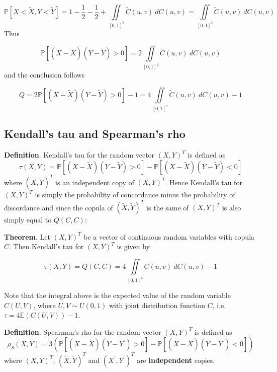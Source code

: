\documentclass{article}
\begin{document}
\begin{equation}
\mathbb{P}[X < \tilde X, Y < \tilde Y] = 1 - \frac{1}{2} - \frac{1}{2} + \iint\limits_{[0, 1]^2} \tilde C(u, v) \> dC(u, v) =
\iint\limits_{[0, 1]^2} \tilde C(u, v) \> dC(u, v)
\end{equation}
Thus

\begin{equation}
\mathbb{P}[(X-\tilde X)(Y-\tilde Y) > 0] = 2 \iint\limits_{[0, 1]^2} \tilde C(u, v) \> dC(u, v)
\end{equation}
and the conclusion follows

\begin{equation}
Q = 2 \mathbb{P}[(X-\tilde X)(Y-\tilde Y) > 0] - 1 = 4 \iint\limits_{[0, 1]^2} \tilde C(u, v) \> dC(u, v) - 1
\end{equation}

\subsection{Kendall's tau and Spearman's rho}

\textbf{Definition}. Kendall's tau for the random vector $(X, Y)^T$ is defined as
\begin{equation}
\tau (X, Y) =\mathbb{P}[(X-\tilde X)(Y-\tilde Y) > 0]-\mathbb{P}[(X-\tilde X)(Y-\tilde Y) < 0] 
\end{equation}
where $(\tilde X, \tilde Y)^T$ is an independent copy of $(X, Y)^T$.
Hence Kendall's tau for $(X, Y)^T$ is simply the probability of concordance minus the probability of discordance and since the copula of  $(\tilde X, \tilde Y)^T$ is the same of $(X, Y)^T$ is also simply equal to $Q(C, C)$:

\noindent\textbf{Theorem}. Let $(X, Y)^T$ be a vector of continuous random variables with copula $C$. Then Kendall's tau for $(X, Y)^T$ is given by 

\begin{equation}
\tau (X,Y) = Q(C, C) = 4 \iint\limits_{[0, 1]^2} C(u, v) \> dC(u, v) - 1
\end{equation}

\noindent Note that the integral above is the expected value of the random variable $C(U, V)$, where $U, V \sim U(0, 1)$ with joint distribution function $C$, i.e. $\tau = 4 \mathbb{E}(C(U,V)) - 1$.

\textbf{Definition}.  Spearman's rho for the random vector  $(X, Y)^T$ is defined as
\begin{equation}
\rho_S (X, Y) =3 (\mathbb{P}[(X-\tilde X)(Y-Y^\prime) > 0]-\mathbb{P}[(X-\tilde X)(Y-Y^\prime ) < 0]) 
\end{equation}
where $(X, Y)^T$, $(\tilde X, \tilde Y)^T$ and $(X^\prime, Y^\prime)^T$ are \textbf{independent} copies.
\end{document}
